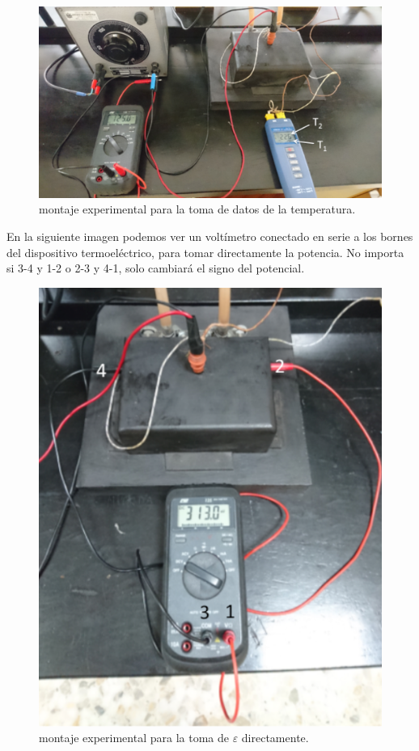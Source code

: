 \documentclass[12pt,a4paper]{article}
\begin{document}
\begin{figure}[h!] \centering
\includegraphics[scale=0.80]{foto4.png}
\caption{montaje experimental para la toma de datos de la temperatura.}
\label{Fig:foto4}
\end{figure}


En la siguiente imagen podemos ver un voltímetro conectado en serie a los bornes del dispositivo termoeléctrico, para tomar directamente la potencia. No importa si 3-4 y 1-2 o 2-3 y 4-1, solo cambiará el signo del potencial. 


\begin{figure}[h!] \centering
\includegraphics[scale=0.75]{foto5.png}
\caption{montaje experimental para la toma de $\varepsilon$ directamente.}
\label{Fig:foto5}
\end{figure}
\end{document}
